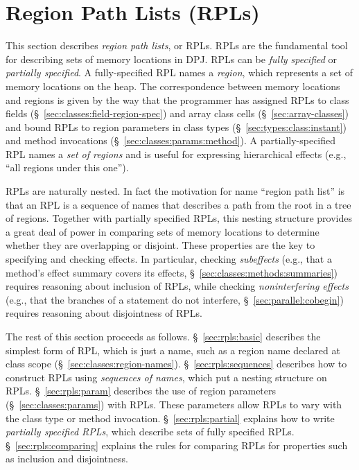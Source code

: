 \section{Region Path Lists (RPLs)%
\label{sec:rpls}}

This section describes \emph{region path lists}, or RPLs.  RPLs are
the fundamental tool for describing sets of memory locations in DPJ.
RPLs can be \emph{fully specified} or \emph{partially specified}.  A
fully-specified RPL names a \emph{region}, which represents a set of
memory locations on the heap. The correspondence between memory
locations and regions is given by the way that the programmer has
assigned RPLs to class fields (\S~\ref{sec:classes:field-region-spec})
and array class cells (\S~\ref{sec:array-classes}) and bound RPLs to
region parameters in class types (\S~\ref{sec:types:class:instant})
and method invocations (\S~\ref{sec:classes:params:method}). A
partially-specified RPL names a \emph{set of regions} and is useful
for expressing hierarchical effects (e.g., ``all regions under this
one'').

RPLs are naturally nested.  In fact the motivation for name ``region
path list'' is that an RPL is a sequence of names that describes a
path from the root in a tree of regions.  Together with partially
specified RPLs, this nesting structure provides a great deal of power
in comparing sets of memory locations to determine whether they are
overlapping or disjoint.  These properties are the key to specifying
and checking effects.  In particular, checking \emph{subeffects}
(e.g., that a method's effect summary covers its effects,
\S~\ref{sec:classes:methods:summaries}) requires reasoning about
inclusion of RPLs, while checking \emph{noninterfering effects} (e.g.,
that the branches of a  statement do not interfere,
\S~\ref{sec:parallel:cobegin}) requires reasoning about disjointness
of RPLs.

The rest of this section proceeds as follows.  \S~\ref{sec:rpls:basic}
describes the simplest form of RPL, which is just a name, such as a
region name declared at class scope
(\S~\ref{sec:classes:region-names}).  \S~\ref{sec:rpls:sequences}
describes how to construct RPLs using \emph{sequences of names}, which
put a nesting structure on RPLs.  \S~\ref{sec:rpls:param} describes
the use of region parameters (\S~\ref{sec:classes:params}) with RPLs.
These parameters allow RPLs to vary with the class type or method
invocation.  \S~\ref{sec:rpls:partial} explains how to write
\emph{partially specified RPLs}, which describe sets of fully
specified RPLs.  \S~\ref{sec:rpls:comparing} explains the rules for
comparing RPLs for properties such as inclusion and disjointness.

